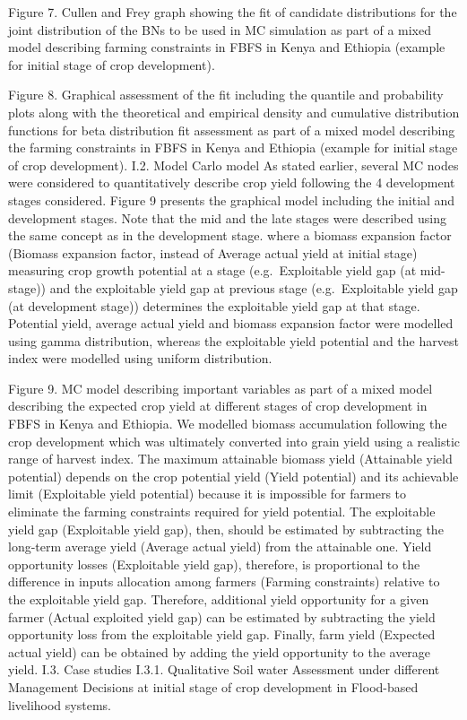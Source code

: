 \documentclass[12pt,oneside]{article}
\begin{document}
Figure 7. Cullen and Frey graph showing the fit of candidate distributions for the joint distribution of the BNs to be used in MC simulation as part of a mixed model describing farming constraints in FBFS in Kenya and Ethiopia (example for initial stage of crop development).

Figure 8. Graphical assessment of the fit including the quantile and probability plots along with the theoretical and empirical density and cumulative distribution functions for beta distribution fit assessment as part of a mixed model describing the farming constraints in FBFS in Kenya and Ethiopia (example for initial stage of crop development).
I.2. Model Carlo model
As stated earlier, several MC nodes were considered to quantitatively describe crop yield following the 4 development stages considered. Figure 9 presents the graphical model including the initial and development stages. Note that the mid and the late stages were described using the same concept as in the development stage. where a biomass expansion factor (Biomass expansion factor, instead of Average actual yield at initial stage) measuring crop growth potential at a stage (e.g.~Exploitable yield gap (at mid-stage)) and the exploitable yield gap at previous stage (e.g.~Exploitable yield gap (at development stage)) determines the exploitable yield gap at that stage. Potential yield, average actual yield and biomass expansion factor were modelled using gamma distribution, whereas the exploitable yield potential and the harvest index were modelled using uniform distribution.

Figure 9. MC model describing important variables as part of a mixed model describing the expected crop yield at different stages of crop development in FBFS in Kenya and Ethiopia.
We modelled biomass accumulation following the crop development which was ultimately converted into grain yield using a realistic range of harvest index. The maximum attainable biomass yield (Attainable yield potential) depends on the crop potential yield (Yield potential) and its achievable limit (Exploitable yield potential) because it is impossible for farmers to eliminate the farming constraints required for yield potential. The exploitable yield gap (Exploitable yield gap), then, should be estimated by subtracting the long-term average yield (Average actual yield) from the attainable one. Yield opportunity losses (Exploitable yield gap), therefore, is proportional to the difference in inputs allocation among farmers (Farming constraints) relative to the exploitable yield gap. Therefore, additional yield opportunity for a given farmer (Actual exploited yield gap) can be estimated by subtracting the yield opportunity loss from the exploitable yield gap. Finally, farm yield (Expected actual yield) can be obtained by adding the yield opportunity to the average yield.
I.3. Case studies
I.3.1. Qualitative Soil water Assessment under different Management Decisions at initial stage of crop development in Flood-based livelihood systems.
\end{document}
